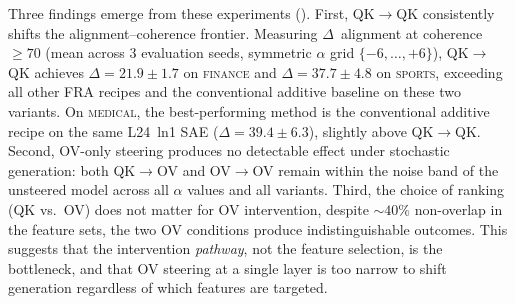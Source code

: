 \documentclass{article}
\theoremstyle{plain}
\theoremstyle{definition}
\theoremstyle{remark}
\begin{document}
Three findings emerge from these experiments (). First, QK$\to$QK consistently shifts the alignment--coherence frontier. Measuring $\Delta$~alignment at coherence $\geq 70$ (mean across 3 evaluation seeds, symmetric $\alpha$ grid $\{-6,\ldots,+6\}$), QK$\to$QK achieves $\Delta = 21.9 \pm 1.7$ on \textsc{finance} and $\Delta = 37.7 \pm 4.8$ on \textsc{sports}, exceeding all other FRA recipes and the conventional additive baseline on these two variants. On \textsc{medical}, the best-performing method is the conventional additive recipe on the same L24~ln1 SAE ($\Delta = 39.4 \pm 6.3$), slightly above QK$\to$QK. Second, OV-only steering produces no detectable effect under stochastic generation: both QK$\to$OV and OV$\to$OV remain within the noise band of the unsteered model across all $\alpha$ values and all variants. Third, the choice of ranking (QK vs.\ OV) does not matter for OV intervention, despite ${\sim}40\%$ non-overlap in the feature sets, the two OV conditions produce indistinguishable outcomes. This suggests that the intervention \emph{pathway}, not the feature selection, is the bottleneck, and that OV steering at a single layer is too narrow to shift generation regardless of which features are targeted.




\end{document}
